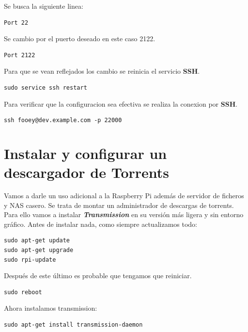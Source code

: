 \documentclass{article}
\begin{document}
Se busca la siguiente linea:

\begin{verbatim}
Port 22  
\end{verbatim}

Se cambio por el puerto deseado en este caso 2122.

\begin{verbatim}
Port 2122  
\end{verbatim}

Para que se vean reflejados los cambio se reinicia el servicio \textbf{SSH}.

\begin{verbatim}
sudo service ssh restart  
\end{verbatim}

Para verificar que la configuracion sea efectiva se realiza la conexion por \textbf{SSH}.

\begin{verbatim}
ssh fooey@dev.example.com -p 22000  
\end{verbatim}

\section{Instalar y configurar un descargador de Torrents}

Vamos a darle un uso adicional a la Raspberry Pi además de servidor de ficheros y NAS casero. Se trata de montar un administrador de descargas de torrents. Para ello vamos a instalar \textbf{\textit{Transmission}} en su versión más ligera y sin entorno gráfico. Antes de instalar nada, como siempre actualizamos todo:

\begin{verbatim}
sudo apt-get update
sudo apt-get upgrade
sudo rpi-update
\end{verbatim}

Después de este último es probable que tengamos que reiniciar.

\begin{verbatim}
sudo reboot
\end{verbatim}

Ahora instalamos transmission:

\begin{verbatim}
sudo apt-get install transmission-daemon
\end{verbatim}
\end{document}
